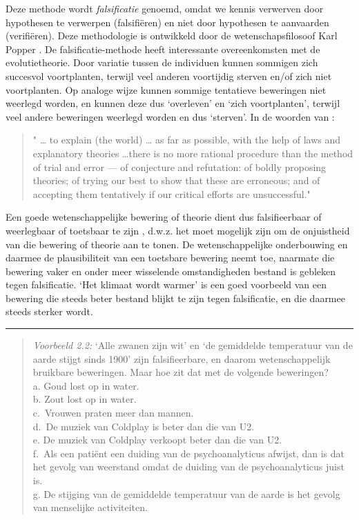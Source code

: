 \documentclass[
]{book}
\begin{document}
Deze methode wordt \emph{falsificatie} genoemd, omdat we kennis verwerven
door hypothesen te verwerpen (falsifiëren) en niet door hypothesen te
aanvaarden (verifiëren). Deze methodologie is ontwikkeld door de
wetenschapsfilosoof Karl Popper \citep{Popp35, Popp59, Popp63}. De
falsificatie-methode heeft interessante overeenkomsten met de
evolutietheorie. Door variatie tussen de individuen kunnen sommigen zich
succesvol voortplanten, terwijl veel anderen voortijdig sterven en/of
zich niet voortplanten. Op analoge wijze kunnen sommige tentatieve
beweringen niet weerlegd worden, en kunnen deze dus `overleven' en `zich
voortplanten', terwijl veel andere beweringen weerlegd worden en dus
`sterven'. In de woorden van \citep[p.51]{Popp63}:

\begin{quote}
" \ldots{} to explain (the world) \ldots{} as far as possible, with the help of laws and explanatory theories \ldots there is no more rational procedure than the method of trial and error --- of conjecture and refutation: of boldly proposing theories; of trying our best to show that these are erroneous; and of accepting them tentatively if our critical efforts are unsuccessful."
\end{quote}

Een goede wetenschappelijke bewering of theorie dient dus falsifieerbaar
of weerlegbaar of toetsbaar te zijn \citep{Popp63}, d.w.z. het moet mogelijk
zijn om de onjuistheid van die bewering of theorie aan te tonen. De
wetenschappelijke onderbouwing en daarmee de plausibiliteit van een
toetsbare bewering neemt toe, naarmate die bewering vaker en onder meer
wisselende omstandigheden bestand is gebleken tegen falsificatie. `Het
klimaat wordt warmer' is een goed voorbeeld van een bewering die steeds
beter bestand blijkt te zijn tegen falsificatie, en die daarmee steeds
sterker wordt.

\begin{center}\rule{0.5\linewidth}{0.5pt}\end{center}

\begin{quote}
\emph{Voorbeeld 2.2:} `Alle zwanen zijn wit' en
`de gemiddelde temperatuur van de aarde stijgt sinds 1900'
zijn falsifieerbare, en daarom wetenschappelijk bruikbare
beweringen. Maar hoe zit dat met de volgende beweringen?\\
a. Goud lost op in water.\\
b. Zout lost op in water.\\
c.~Vrouwen praten meer dan mannen.\\
d.~De muziek van Coldplay is beter dan die van U2.\\
e. De muziek van Coldplay verkoopt beter dan die van U2.\\
f.~Als een patiënt een duiding van de psychoanalyticus afwijst, dan is dat het gevolg van weerstand omdat de duiding van de
psychoanalyticus juist is.\\
g. De stijging van de gemiddelde temperatuur van de aarde is het gevolg van menselijke activiteiten.
\end{quote}
\end{document}
